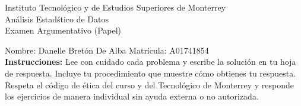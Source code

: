 \documentclass[10pt]{report}
\begin{document}
\newpage



\begin{center}
{\large Instituto Tecnol\'{o}gico y de Estudios Superiores de Monterrey \\
An\'alisis Estad\'stico de Datos } \\
Examen Argumentativo (Papel)
\end{center}

Nombre: \underline{\hspace*{.2in}}
Danelle Bret\'on De Alba
\underline{\hspace*{.2in}} \quad Matr\'icula:\underline{\hspace*{.2in}}
A01741854
\underline{\hspace*{.2in}} \\

{\bf Instrucciones:} Lee con cuidado cada problema y escribe la soluci\'on
en tu hoja de respuesta. Incluye tu procedimiento que muestre c\'omo obtienes tu respuesta.  Respeta el c\'odigo de \'etica del curso y del Tecnol\'ogico de Monterrey y responde los ejercicios de manera individual sin ayuda externa o no autorizada.
\end{document}
